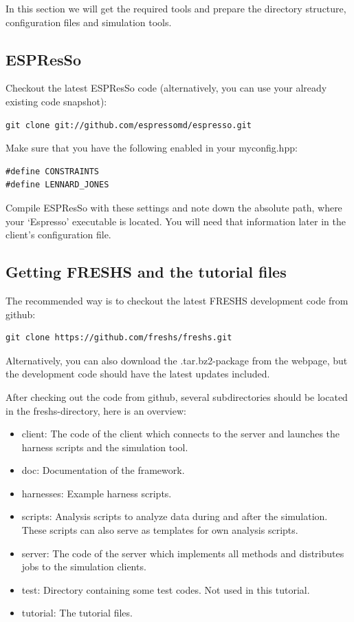 \documentclass[a4paper,oneside]{article}
\newenvironment{mylisting}
{\begin{list}{}{\setlength{\leftmargin}{1em}}\item\scriptsize\bfseries}
{\end{list}}
\begin{document}
In this section we will get the required tools and prepare the directory structure, configuration files and simulation tools.

\subsection{ESPResSo}
Checkout the latest ESPResSo code (alternatively, you can use your already existing code snapshot):
\begin{mylisting}
\begin{verbatim}
git clone git://github.com/espressomd/espresso.git
\end{verbatim}
\end{mylisting}
Make sure that you have the following enabled in your myconfig.hpp:
\begin{lstlisting}
#define CONSTRAINTS
#define LENNARD_JONES
\end{lstlisting}
Compile ESPResSo with these settings and note down the absolute path, where your `Espresso' executable is located. You will need that information later in the client's configuration file.


\subsection{Getting FRESHS and the tutorial files}

The recommended way is to checkout the latest FRESHS development code from github:
\begin{mylisting}
\begin{verbatim}
git clone https://github.com/freshs/freshs.git
\end{verbatim}
\end{mylisting}
Alternatively, you can also download the .tar.bz2-package from the webpage, but the development code should have the latest updates included.

After checking out the code from github, several subdirectories should be located in the freshs-directory, here is an overview:
\begin{itemize}
 \item client: The code of the client which connects to the server and launches the harness scripts and the simulation tool.
 \item doc: Documentation of the framework.
 \item harnesses: Example harness scripts.
 \item scripts: Analysis scripts to analyze data during and after the simulation. These scripts can also serve as templates for own analysis scripts.
 \item server: The code of the server which implements all methods and distributes jobs to the simulation clients.
 \item test: Directory containing some test codes. Not used in this tutorial.
 \item tutorial: The tutorial files.
\end{itemize}
\end{document}
